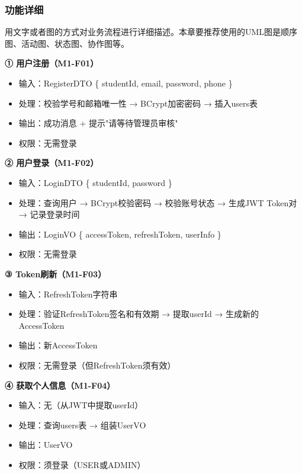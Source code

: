 \documentclass[12pt,a4paper]{ctexart}
\numberwithin{figure}{section}
\numberwithin{table}{section}
\begin{document}
\subsubsection{功能详细}

用文字或者图的方式对业务流程进行详细描述。本章要推荐使用的UML图是顺序图、活动图、状态图、协作图等。

\textbf{① 用户注册（M1-F01）}

\begin{itemize}
    \item 输入：RegisterDTO \{ studentId, email, password, phone \}
    \item 处理：校验学号和邮箱唯一性 → BCrypt加密密码 → 插入users表
    \item 输出：成功消息 + 提示"请等待管理员审核"
    \item 权限：无需登录
\end{itemize}

\textbf{② 用户登录（M1-F02）}

\begin{itemize}
    \item 输入：LoginDTO \{ studentId, password \}
    \item 处理：查询用户 → BCrypt校验密码 → 校验账号状态 → 生成JWT Token对 → 记录登录时间
    \item 输出：LoginVO \{ accessToken, refreshToken, userInfo \}
    \item 权限：无需登录
\end{itemize}

\textbf{③ Token刷新（M1-F03）}

\begin{itemize}
    \item 输入：RefreshToken字符串
    \item 处理：验证RefreshToken签名和有效期 → 提取userId → 生成新的AccessToken
    \item 输出：新AccessToken
    \item 权限：无需登录（但RefreshToken须有效）
\end{itemize}

\textbf{④ 获取个人信息（M1-F04）}

\begin{itemize}
    \item 输入：无（从JWT中提取userId）
    \item 处理：查询users表 → 组装UserVO
    \item 输出：UserVO
    \item 权限：须登录（USER或ADMIN）
\end{itemize}
\end{document}
